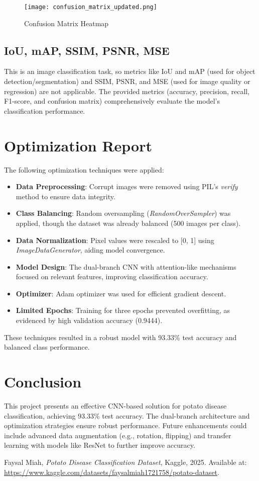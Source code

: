 \documentclass{article}
\begin{document}
\begin{figure}[t]
    \centering
    \texttt{[image: confusion\_matrix\_updated.png]}
    \caption{Confusion Matrix Heatmap}
    \label{fig:conf_matrix}
\end{figure}

\subsection{IoU, mAP, SSIM, PSNR, MSE}
This is an image classification task, so metrics like IoU and mAP (used for object detection/segmentation) and SSIM, PSNR, and MSE (used for image quality or regression) are not applicable. The provided metrics (accuracy, precision, recall, F1-score, and confusion matrix) comprehensively evaluate the model's classification performance.

\section{Optimization Report}
The following optimization techniques were applied:
\begin{itemize}
    \item \textbf{Data Preprocessing}: Corrupt images were removed using PIL's \textit{verify} method to ensure data integrity.
    \item \textbf{Class Balancing}: Random oversampling (\textit{RandomOverSampler}) was applied, though the dataset was already balanced (500 images per class).
    \item \textbf{Data Normalization}: Pixel values were rescaled to [0, 1] using \textit{ImageDataGenerator}, aiding model convergence.
    \item \textbf{Model Design}: The dual-branch CNN with attention-like mechanisms focused on relevant features, improving classification accuracy.
    \item \textbf{Optimizer}: Adam optimizer was used for efficient gradient descent.
    \item \textbf{Limited Epochs}: Training for three epochs prevented overfitting, as evidenced by high validation accuracy (0.9444).
\end{itemize}
These techniques resulted in a robust model with 93.33\% test accuracy and balanced class performance.

\section{Conclusion}
This project presents an effective CNN-based solution for potato disease classification, achieving 93.33\% test accuracy. The dual-branch architecture and optimization strategies ensure robust performance. Future enhancements could include advanced data augmentation (e.g., rotation, flipping) and transfer learning with models like ResNet to further improve accuracy.

\begin{thebibliography}{9}
Faysal Miah, \emph{Potato Disease Classification Dataset}, Kaggle, 2025. Available at: \url{https://www.kaggle.com/datasets/faysalmiah1721758/potato-dataset}.
\end{thebibliography}
\end{document}
